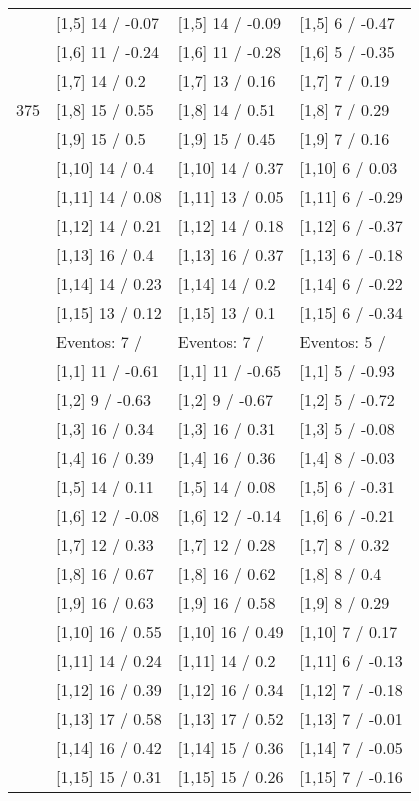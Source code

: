 \begin{table}
\begin{tabular}[t]{llll}
 & {}[1,5] 14  / -0.07 & {}[1,5] 14  / -0.09 & {}[1,5] 6  / -0.47\\
 & {}[1,6] 11  / -0.24 & {}[1,6] 11  / -0.28 & {}[1,6] 5  / -0.35\\
 & {}[1,7] 14  / 0.2 & {}[1,7] 13  / 0.16 & {}[1,7] 7  / 0.19\\
375 & {}[1,8] 15  / 0.55 & {}[1,8] 14  / 0.51 & {}[1,8] 7  / 0.29\\
\addlinespace
 & {}[1,9] 15  / 0.5 & {}[1,9] 15  / 0.45 & {}[1,9] 7  / 0.16\\
 & {}[1,10] 14  / 0.4 & {}[1,10] 14  / 0.37 & {}[1,10] 6  / 0.03\\
 & {}[1,11] 14  / 0.08 & {}[1,11] 13  / 0.05 & {}[1,11] 6  / -0.29\\
 & {}[1,12] 14  / 0.21 & {}[1,12] 14  / 0.18 & {}[1,12] 6  / -0.37\\
 & {}[1,13] 16  / 0.4 & {}[1,13] 16  / 0.37 & {}[1,13] 6  / -0.18\\
\addlinespace
 & {}[1,14] 14  / 0.23 & {}[1,14] 14  / 0.2 & {}[1,14] 6  / -0.22\\
 & {}[1,15] 13  / 0.12 & {}[1,15] 13  / 0.1 & {}[1,15] 6  / -0.34\\
 & Eventos:  7 / & Eventos:  7 / & Eventos:  5 /\\
 & {}[1,1] 11  / -0.61 & {}[1,1] 11  / -0.65 & {}[1,1] 5  / -0.93\\
 & {}[1,2] 9  / -0.63 & {}[1,2] 9  / -0.67 & {}[1,2] 5  / -0.72\\
\addlinespace
 & {}[1,3] 16  / 0.34 & {}[1,3] 16  / 0.31 & {}[1,3] 5  / -0.08\\
 & {}[1,4] 16  / 0.39 & {}[1,4] 16  / 0.36 & {}[1,4] 8  / -0.03\\
 & {}[1,5] 14  / 0.11 & {}[1,5] 14  / 0.08 & {}[1,5] 6  / -0.31\\
 & {}[1,6] 12  / -0.08 & {}[1,6] 12  / -0.14 & {}[1,6] 6  / -0.21\\
 & {}[1,7] 12  / 0.33 & {}[1,7] 12  / 0.28 & {}[1,7] 8  / 0.32\\
\addlinespace
500 & {}[1,8] 16  / 0.67 & {}[1,8] 16  / 0.62 & {}[1,8] 8  / 0.4\\
 & {}[1,9] 16  / 0.63 & {}[1,9] 16  / 0.58 & {}[1,9] 8  / 0.29\\
 & {}[1,10] 16  / 0.55 & {}[1,10] 16  / 0.49 & {}[1,10] 7  / 0.17\\
 & {}[1,11] 14  / 0.24 & {}[1,11] 14  / 0.2 & {}[1,11] 6  / -0.13\\
 & {}[1,12] 16  / 0.39 & {}[1,12] 16  / 0.34 & {}[1,12] 7  / -0.18\\
\addlinespace
 & {}[1,13] 17  / 0.58 & {}[1,13] 17  / 0.52 & {}[1,13] 7  / -0.01\\
 & {}[1,14] 16  / 0.42 & {}[1,14] 15  / 0.36 & {}[1,14] 7  / -0.05\\
 & {}[1,15] 15  / 0.31 & {}[1,15] 15  / 0.26 & {}[1,15] 7  / -0.16\\
\bottomrule
\end{tabular}
\end{table}
